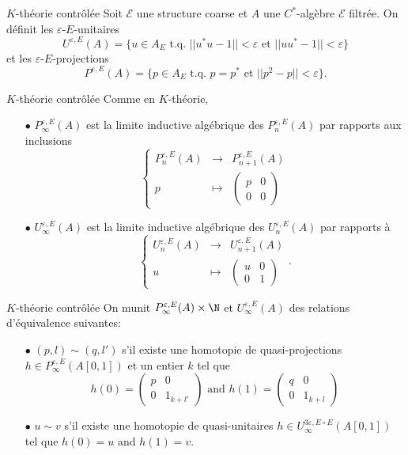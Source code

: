 \begin{frame}{$K$-théorie contrôlée}
Soit $\mathcal E$ une structure coarse et $A$ une $C^*$-algèbre $\mathcal E$ filtrée. On définit les $\varepsilon$-$E$-unitaires
\[U^{\varepsilon, E}(A)= \{u\in A_E \text{ t.q. } ||u^*u-1||<\varepsilon\text{ et }||uu^*-1||<\varepsilon \}\]
et les $\varepsilon$-$E$-projections 
\[P^{\varepsilon, E}(A)= \{p\in A_E \text{ t.q. } p=p^*\text{ et }||p^2-p||<\varepsilon \}.\]
\end{frame}

\begin{frame}{$K$-théorie contrôlée}
Comme en $K$-théorie, 
\begin{itemize}
\item[$\bullet$] $P_\infty^{\varepsilon, E}(A)$ est la limite inductive algébrique des $P_n^{\varepsilon, E}(A)$ par rapports aux inclusions
\[\left\{\begin{array}{rcl}
	P^{\varepsilon,E}_n(A) 		& \rightarrow	& P^{\varepsilon,E}_{n+1}(A)\\ 
	p 		& \mapsto 	& \begin{pmatrix}p& 0 \\ 0&0 \end{pmatrix}
\end{array}\right.\]
\item[$\bullet$] $U_\infty^{\varepsilon, E}(A)$ est la limite inductive algébrique des $U_n^{\varepsilon, E}(A)$ par rapports à
\[\left\{\begin{array}{rcl}
	U^{\varepsilon,E}_n(A) 		& \rightarrow	& U^{\varepsilon,E}_{n+1}(A)\\ 
	u 		& \mapsto 	& \begin{pmatrix}u & 0 \\ 0& 1 \end{pmatrix}
\end{array}\right. .\]
\end{itemize}
\end{frame}

\begin{frame}{$K$-théorie contrôlée}
On munit $P_\infty^{\varepsilon, E}(A)\times \N$ et $U_\infty^{\varepsilon, E}(A)$ des relations d'équivalence suivantes:
\begin{itemize}
\item[$\bullet$] $(p,l) \sim (q,l')$ s'il existe une homotopie de quasi-projections $h\in P^{\varepsilon, E}_\infty(A[0,1])$ et un entier $k$ tel que 
\[h(0)=\begin{pmatrix} p & 0 \\ 0 & 1_{k+l'} \end{pmatrix} \text{ and }
h(1)=\begin{pmatrix} q & 0 \\ 0 & 1_{k+l} \end{pmatrix}\]
\item[$\bullet$] $u \sim v$ s'il existe une homotopie de quasi-unitaires $h\in U^{3\varepsilon, E\circ E}_\infty(A[0,1])$ tel que $h(0)= u \text{ and }h(1)=v$.\\
\end{itemize}
\end{frame}

